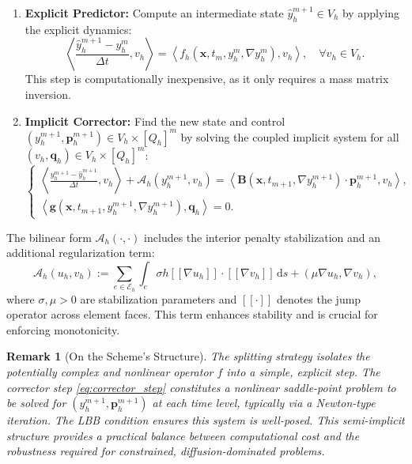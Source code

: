 \documentclass[pdflatex,sn-mathphys-num]{sn-jnl}%
\theoremstyle{thmstyleone}%
\newtheorem{rmk}{Remark}[section]
\numberwithin{equation}{section}
\begin{document}
\begin{enumerate}
    \item \textbf{Explicit Predictor:} Compute an intermediate state $\hat{y}_h^{m+1} \in V_h$ by applying the explicit dynamics:
    \begin{equation}
    \label{eq:predictor_step}
        \left\langle \frac{\hat{y}_h^{m+1} - y_h^m}{\Delta t}, v_h \right\rangle = \left\langle f_h(\bm{x}, t_m, y_h^m, \nabla y_h^m), v_h \right\rangle, \quad \forall v_h \in V_h.
    \end{equation}
    This step is computationally inexpensive, as it only requires a mass matrix inversion.

    \item \textbf{Implicit Corrector:} Find the new state and control $(y_h^{m+1}, \bm{p}_h^{m+1}) \in V_h \times [Q_h]^m$ by solving the coupled implicit system for all $(v_h, \bm{q}_h) \in V_h \times [Q_h]^m$:
    \begin{equation}
    \label{eq:corrector_step}
    \begin{cases}
        \left\langle \frac{y_h^{m+1} - \hat{y}_h^{m+1}}{\Delta t}, v_h \right\rangle + \mathcal{A}_h(y_h^{m+1}, v_h) = \left\langle \bm{B}(\bm{x}, t_{m+1}, \nabla y_h^{m+1}) \cdot \bm{p}_h^{m+1}, v_h \right\rangle, \\
        \left\langle \bm{g}(\bm{x}, t_{m+1}, y_h^{m+1}, \nabla y_h^{m+1}), \bm{q}_h \right\rangle = 0.
    \end{cases}
    \end{equation}
\end{enumerate}
The bilinear form $\mathcal{A}_h(\cdot, \cdot)$ includes the interior penalty stabilization and an additional regularization term:
$$\mathcal{A}_h(u_h, v_h) := \sum_{e \in \mathcal{E}_h} \int_e \sigma h [\![ \nabla u_h ]\!] \cdot [\![ \nabla v_h ]\!] \, \mathrm{d}s + (\mu \nabla u_h, \nabla v_h),$$
where $\sigma, \mu > 0$ are stabilization parameters and $[\![ \cdot ]\!]$ denotes the jump operator across element faces. This term enhances stability and is crucial for enforcing monotonicity.

\begin{rmk}[On the Scheme's Structure]
The splitting strategy isolates the potentially complex and nonlinear operator $f$ into a simple, explicit step. The corrector step \eqref{eq:corrector_step} constitutes a nonlinear saddle-point problem to be solved for $(y_h^{m+1}, \bm{p}_h^{m+1})$ at each time level, typically via a Newton-type iteration. The LBB condition ensures this system is well-posed. This semi-implicit structure provides a practical balance between computational cost and the robustness required for constrained, diffusion-dominated problems.
\end{rmk}
\end{document}
